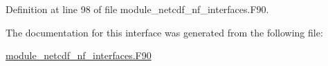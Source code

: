Definition at line 98 of file module\+\_\+netcdf\+\_\+nf\+\_\+interfaces.\+F90.



The documentation for this interface was generated from the following file\+:\begin{DoxyCompactItemize}
\item 
\hyperlink{module__netcdf__nf__interfaces_8F90}{module\+\_\+netcdf\+\_\+nf\+\_\+interfaces.\+F90}\end{DoxyCompactItemize}
